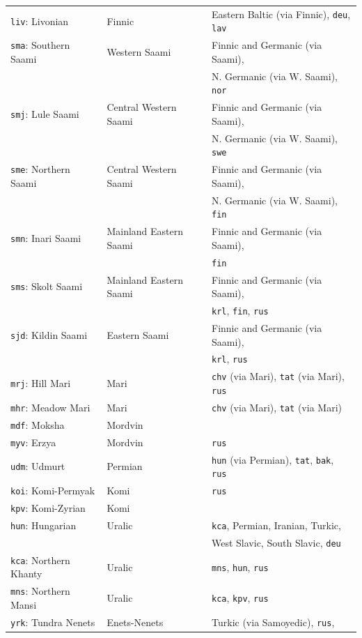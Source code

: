\begin{center}
\begin{longtable}{lll}
\texttt{liv}: Livonian & Finnic & Eastern Baltic (via Finnic), \texttt{deu}, \texttt{lav}\\
\texttt{sma}: Southern Saami & Western Saami & Finnic and Germanic (via Saami),\\
& & N. Germanic (via W. Saami), \texttt{nor}\\
\texttt{smj}: Lule Saami & Central Western Saami & Finnic and Germanic (via Saami),\\
& & N. Germanic (via W. Saami), \texttt{swe}\\
\texttt{sme}: Northern Saami & Central Western Saami & Finnic and Germanic (via Saami),\\
& & N. Germanic (via W. Saami), \texttt{fin}\\
\texttt{smn}: Inari Saami & Mainland Eastern Saami & Finnic and Germanic (via Saami),\\ & & \texttt{fin}\\
\texttt{sms}: Skolt Saami & Mainland Eastern Saami & Finnic and Germanic (via Saami),\\
& & \texttt{krl}, \texttt{fin}, \texttt{rus}\\
\texttt{sjd}: Kildin Saami & Eastern Saami & Finnic and Germanic (via Saami),\\
& & \texttt{krl}, \texttt{rus}\\
\texttt{mrj}: Hill Mari & Mari &  \texttt{chv} (via Mari), \texttt{tat} (via Mari), \texttt{rus}\\
\texttt{mhr}: Meadow Mari & Mari & \texttt{chv} (via Mari), \texttt{tat} (via Mari)\\
\texttt{mdf}: Moksha & Mordvin & \\
\texttt{myv}: Erzya & Mordvin & \texttt{rus}\\
\texttt{udm}: Udmurt & Permian & \texttt{hun} (via Permian), \texttt{tat}, \texttt{bak}, \texttt{rus}\\
\texttt{koi}: Komi-Permyak & Komi & \texttt{rus}\\
\texttt{kpv}: Komi-Zyrian & Komi & \\
\texttt{hun}: Hungarian & Uralic & \texttt{kca}, Permian, Iranian, Turkic,\\
& & West Slavic, South Slavic, \texttt{deu}\\
\texttt{kca}: Northern Khanty & Uralic & \texttt{mns}, \texttt{hun}, \texttt{rus}\\
\texttt{mns}: Northern Mansi & Uralic & \texttt{kca}, \texttt{kpv}, \texttt{rus}\\
\texttt{yrk}: Tundra Nenets & Enets-Nenets & Turkic (via Samoyedic), \texttt{rus},\\

\end{longtable}
\end{center}
